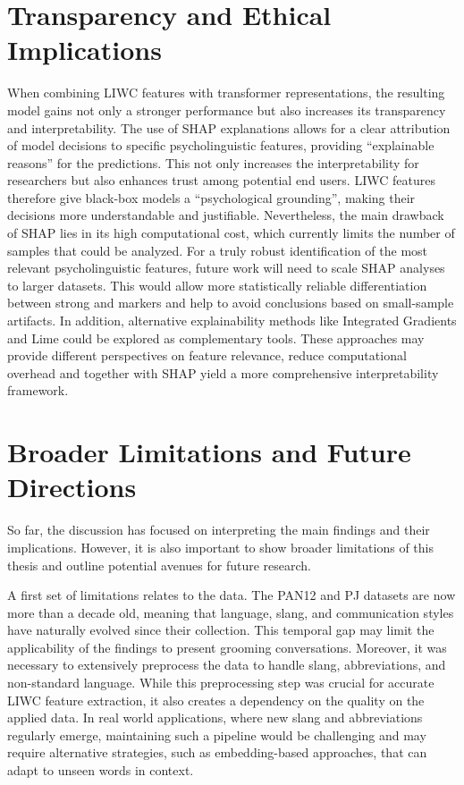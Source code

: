 \section{Transparency and Ethical Implications}

When combining LIWC features with transformer representations, the resulting model gains not only a stronger performance but also increases its transparency and interpretability. The use of SHAP explanations allows for a clear attribution of model decisions to specific psycholinguistic features, providing “explainable reasons” for the predictions. This not only increases the interpretability for researchers but also enhances trust among potential end users. LIWC features therefore give black-box models a “psychological grounding”, making their decisions more understandable and justifiable. Nevertheless, the main drawback of SHAP lies in its high computational cost, which currently limits the number of samples that could be analyzed. For a truly robust identification of the most relevant psycholinguistic features, future work will need to scale SHAP analyses to larger datasets. This would allow more statistically reliable differentiation between strong and markers and help to avoid conclusions based on small-sample artifacts. In addition, alternative explainability methods like Integrated Gradients\cite{integratedgradients} and Lime \cite{ribeiro2016lime} could be explored as complementary tools. These approaches may provide different perspectives on feature relevance, reduce computational overhead and together with SHAP yield a more comprehensive interpretability framework.


\section{Broader Limitations and Future Directions}

So far, the discussion has focused on interpreting the main findings and their implications. However, it is also important to show broader limitations of this thesis and outline potential avenues for future research.  

A first set of limitations relates to the data. The PAN12 and PJ datasets are now more than a decade old, meaning that language, slang, and communication styles have naturally evolved since their collection. This temporal gap may limit the applicability of the findings to present grooming conversations. Moreover, it was necessary to extensively preprocess the data to handle slang, abbreviations, and non-standard language. While this preprocessing step was crucial for accurate LIWC feature extraction, it also creates a dependency on the quality on the applied data. In real world applications, where new slang and abbreviations regularly emerge, maintaining such a pipeline would be challenging and may require alternative strategies, such as embedding-based approaches, that can adapt to unseen words in context.  

